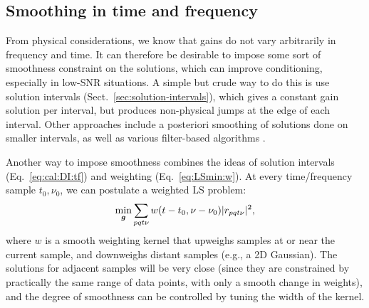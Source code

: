 \documentclass[useAMS,usenatbib]{mn2e}
\numberwithin{equation}{section}
\begin{document}
\subsection{Smoothing in time and frequency}
\label{sec:DI:smooth}

From physical considerations, we know that gains do not vary arbitrarily in frequency and time. It can
therefore be desirable to impose some sort of smoothness constraint on the solutions, which can improve conditioning, especially
in low-SNR situations. A simple but crude way to do this is use solution intervals (Sect.~\ref{sec:solution-intervals}),
which gives a constant gain solution per interval, but produces non-physical jumps at the edge of each interval.
Other approaches include a posteriori smoothing of solutions done on smaller intervals, as well as various filter-based 
algorithms \citep{tasse-filters}. 

Another way to impose smoothness combines the ideas of solution intervals  (Eq.~\ref{eq:cal:DI:tf}) 
and weighting (Eq.~\ref{eq:LSmin:w}). At every time/frequency sample $t_0,\nu_0$, we can postulate a weighted 
LS problem:
\begin{equation}
\label{eq:cal:DI:smooth}
\min_{\bmath{g}}\sum_{pqt\nu}w(t-t_0,\nu-\nu_0)|r_{pqt\nu}|^2, 
\end{equation}
where $w$ is a smooth weighting kernel that upweighs samples at or near the current sample, and downweighs distant 
samples (e.g., a 2D Gaussian). The solutions for adjacent samples will be very close (since they 
are constrained by practically the same range of data points, with only a smooth change in weights), and the 
degree of smoothness can be controlled by tuning the width of the kernel.
\end{document}
